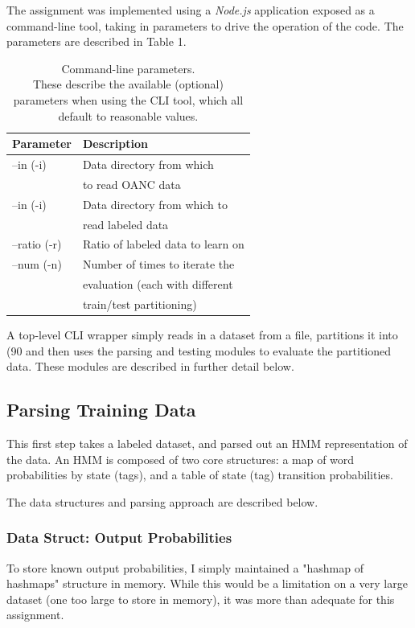 \documentclass[11pt]{article}
\begin{document}
The assignment was implemented using a {\em Node.js} application exposed as
a command-line tool, taking in parameters to drive the operation of the
code. The parameters are described in Table 1.

\begin{table}[h]
\begin{center}
\begin{tabular}{|l|l|}
\hline \bf Parameter & \bf Description \\ \hline
--in (-i)            & Data directory from which \\
                     & to read OANC data \\
--in (-i)            & Data directory from which to  \\
                     & read labeled data \\
--ratio (-r)         & Ratio of labeled data to learn on \\
--num (-n)           & Number of times to iterate the \\
                     & evaluation (each with different \\
                     & train/test partitioning) \\

\hline
\end{tabular}
\end{center}
\caption{\label{cliParams} Command-line parameters. \\
These describe the available (optional) parameters when using
the CLI tool, which all default to reasonable values.}
\end{table}

A top-level CLI wrapper simply reads in a dataset from a file,
partitions it into (90%
and then uses the parsing and testing modules to evaluate the
partitioned data. These modules are described in further detail
below.

\subsection{Parsing Training Data}
This first step takes a labeled dataset, and parsed out an HMM
representation of the data.  An HMM is composed of two core structures:
a map of word probabilities by state (tags), and a table of state (tag)
transition probabilities.

The data structures and parsing approach are described below.

\subsubsection{Data Struct: Output Probabilities}
To store known output probabilities, I simply maintained a
"hashmap of hashmaps" structure in memory.  While this would be a limitation
on a very large dataset (one too large to store in memory), it was more
than adequate for this assignment.
\end{document}
